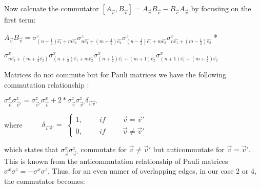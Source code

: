 \documentclass[12pt]{report}
\begin{document}
	\begin{minipage}{1\textwidth}
		
		Now calcuate the commutator $[A_{\vec{v}},B_{\vec{v}}] = A_{\vec{v}}B_{\vec{v}} - B_{\vec{v}}A_{\vec{v}}$ by focusiing on the first term:\newline
		
		\begin{center}
			
			$ A_{\vec{v}}B_{\vec{v}} =
			\sigma^z_{(n+\frac{1}{2})\hat{e_1} + m\hat{e_2}} \sigma^z_{n\hat{e_1}+(m+\frac{1}{2})\hat{e_2}} \sigma^z_{(n-\frac{1}{2})\hat{e_1} + m\hat{e_2}} \sigma^z_{n\hat{e_1}+(m-\frac{1}{2})\hat{e_2}} $ *
			
			$\sigma^x_{n\hat{e_1} + (m+\frac{1}{2}\hat{e_2})} \sigma^x_{(n+ \frac{1}{2})\hat{e_1} + m\hat{e_2}} \sigma^x_{(n+ \frac{1}{2})\hat{e_1} + (m + 1)\hat{e_2}} \sigma^x_{(n+ 1)\hat{e_1} + (m + \frac{1}{2})\hat{e_2}}$\newline
			
		\end{center}
		
		
		Matrices do not commute but for Pauli matrices we have the following commutation relationship :\newline
		
		
		\begin{center}
			$\sigma^x_{\vec{v}}\sigma^z_{\vec{v}'} = \sigma^z_{\vec{v}'} \sigma^x_{\vec{v}} + 2* \sigma^x_{\vec{v}}\sigma^z_{\vec{v}'} \delta_{\vec{v} \vec{v}'}$\newline
		\end{center}
		
		
		where $\hspace{1cm} \delta_{\vec{v} \vec{v}'} =$
		$\begin{cases}
			1, \hspace{1cm} if \hspace{1cm}  \vec{v} = \vec{v}'\\
			0, \hspace{1cm} if \hspace{1cm} \vec{v} \neq \vec{v}'
		\end{cases}$\newline
		
		which states that 	$\sigma^x_{\vec{v}}\sigma^z_{\vec{v}'}$ commutate for $\vec{v} \neq \vec{v}'$   but anticommutate for $\vec{v} = \vec{v}'$. This is known from the anticommutation relationship of Pauli matrices $\sigma^x \sigma^z = - \sigma^x \sigma^z$. Thus, for an even numer of overlapping edges, in our case 2 or 4, the commutator becomes:\newline
		

\end{minipage}
\end{document}
